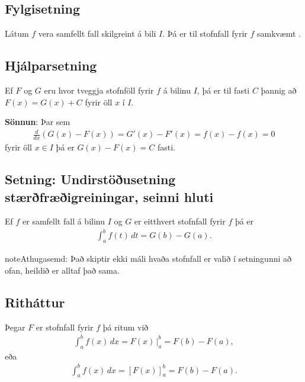 \documentclass[b5paper,11pt,icelandic]{sphinxmanual}
\begin{document}
\subsection{Fylgisetning}
\label{kafli06:id8}
Látum \(f\) vera samfellt fall skilgreint á bili \(I\). Þá er
til stofnfall fyrir \(f\)
samkvæmt {\hyperref[kafli06:undirstodusetning\string-fyrri]{}}.


\subsection{Hjálparsetning}
\label{kafli06:hjalparsetning}
Ef \(F\) og \(G\) eru hvor tveggja stofnföll fyrir \(f\) á
bilinu \(I\), þá er til fasti \(C\) þannig að
\(F(x)=G(x)+C\) fyrir öll \(x\) í \(I\).

\textbf{Sönnun}: Þar sem
\begin{equation*}
\begin{split}\frac{d}{dx}(G(x) - F(x)) = G'(x) - F'(x) = f(x) - f(x) = 0\end{split}
\end{equation*}
fyrir öll \(x\in I\) þá er \(G(x)-F(x) = C\) fasti.


\subsection{Setning: Undirstöðusetning stærðfræðigreiningar, seinni hluti}
\label{kafli06:index-8}\label{kafli06:setning-undirstousetning-staerfraeigreiningar-seinni-hluti}
Ef \(f\) er samfellt fall á bilinu \(I\) og \(G\) er
eitthvert stofnfall fyrir \(f\) þá er
\begin{equation*}
\begin{split}\int_a^b f(t)\,dt=G(b)-G(a).\end{split}
\end{equation*}
\begin{notice}{note}{Athugasemd:}
Það skiptir ekki máli hvaða stofnfall er valið í setningunni að ofan,
heildið er alltaf það sama.
\end{notice}


\subsection{Ritháttur}
\label{kafli06:rithattur}
Þegar \(F\) er stofnfall fyrir \(f\) þá ritum við
\begin{equation*}
\begin{split}\int_a^b f(x)\,dx=F(x)\,\bigg|_a^b= F(b)-F(a),\end{split}
\end{equation*}
eða
\begin{equation*}
\begin{split}\int_a^b f(x)\,dx=\left[F(x)\right]_a^b= F(b)-F(a).\end{split}
\end{equation*}
\end{document}
